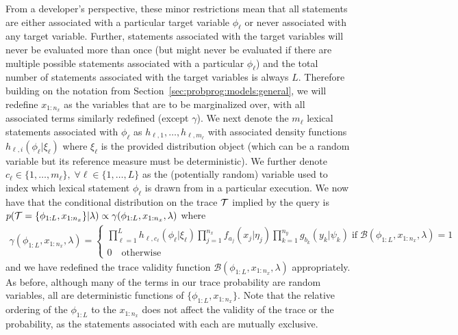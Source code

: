 From a developer's perspective, these minor restrictions mean that all \sample statements are
either associated with a particular target variable $\phi_{\ell}$ or never associated with any target 
variable. Further, \sample
statements associated with the target variables will never be evaluated more than once (but might never
be evaluated if there are multiple possible \sample statements associated with a particular $\phi_{\ell}$) and
the total number of \sample statements associated with the target variables is always $L$.
Therefore building on the notation from Section~\ref{sec:probprog:models:general}, we will redefine $x_{1:n_x}$
as the variables that are to be marginalized over, with all associated terms similarly redefined (except $\gamma$).
We next denote the $m_{\ell}$ lexical \sample statements associated with $\phi_{\ell}$ as 
$h_{\ell,1},\dots,h_{\ell,m_{\ell}}$ with associated density functions $h_{\ell,i}(\phi_{\ell} | \xi_{\ell})$ where
$\xi_{\ell}$ is the provided distribution object (which can be a random variable but its reference measure
must be deterministic).  We further denote $c_{\ell} \in \{1,\dots,m_{\ell}\}, \; 
\forall \ell \in \{1,\dots,L\}$ as the (potentially random) variable used to index which lexical \sample statement
$\phi_{\ell}$ is drawn from in a particular execution.  We now have that the conditional distribution on the trace $\mathcal{T}$ implied
by the query is $p(\mathcal{T} = \{\phi_{1:L},x_{1:n_x}\} | \lambda) \propto \gamma(\phi_{1:L},x_{1:n_x}, \lambda)$
where
\begin{align}
\label{eq:bopp:joint}
\gamma(\phi_{1:L},x_{1:n_x}, \lambda) = \begin{cases}
\prod_{\ell=1}^{L}
h_{\ell,c_{\ell}} (\phi_{\ell} | \xi_{\ell})
\prod_{j=1}^{n_x} 
f_{a_j}(x_j | \eta_j)
\prod_{k=1}^{n_y}
g_{b_k}(y_k | \psi_k) \; \text{if} \; \mathcal{B}(\phi_{1:L},x_{1:n_x},\lambda)=1 \\
0 \quad \text{otherwise}
\end{cases}
\end{align}
and we have redefined the trace validity function $\mathcal{B}(\phi_{1:L},x_{1:n_x},\lambda)$ appropriately.
As before, although many of the terms in our trace probability are random variables, all are deterministic
functions of $\{\phi_{1:L},x_{1:n_x}\}$.  Note that the relative ordering of the $\phi_{1:L}$ to the $x_{1:n_x}$
does not affect the validity of the trace or the probability, as the \sample statements associated with
each are mutually exclusive.


